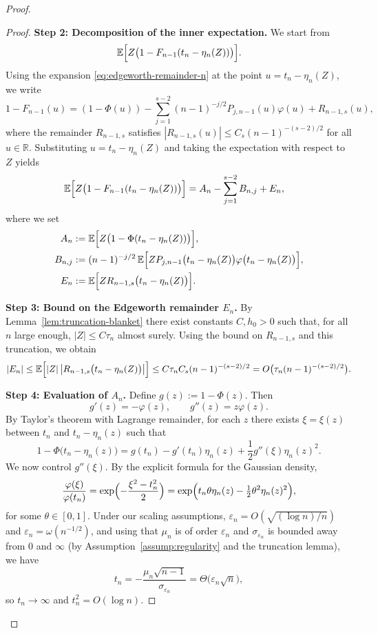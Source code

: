 \documentclass{article}
\theoremstyle{plain}
\theoremstyle{definition}
\begin{document}
\begin{proof}
\begin{proof}
\medskip\noindent\textbf{Step 2: Decomposition of the inner expectation.}
We start from
\[
  \mathbb E\Bigl[
    Z\bigl(1-F_{n-1}(t_n-\eta_n(Z))\bigr)
  \Bigr].
\]
Using the expansion \eqref{eq:edgeworth-remainder-n} at the point
$u=t_n-\eta_n(Z)$, we write
\[
  1-F_{n-1}(u)
  = (1-\Phi(u))
    - \sum_{j=1}^{s-2}(n-1)^{-j/2}P_{j,n-1}(u)\varphi(u)
    + R_{n-1,s}(u),
\]
where the remainder $R_{n-1,s}$ satisfies
\(
  |R_{n-1,s}(u)|
  \le C_s (n-1)^{-(s-2)/2}
\)
for all $u\in\mathbb R$. Substituting $u=t_n-\eta_n(Z)$ and taking the
expectation with respect to $Z$ yields
\begin{align*}
  \mathbb E\Bigl[
    Z\bigl(1-F_{n-1}(t_n-\eta_n(Z))\bigr)
  \Bigr]
  &= A_n - \sum_{j=1}^{s-2}B_{n,j} + E_n,
\end{align*}
where we set
\begin{align*}
  A_n
  &:= \mathbb E\Bigl[
        Z\bigl(1-\Phi(t_n-\eta_n(Z))\bigr)
      \Bigr],\\
  B_{n,j}
  &:= (n-1)^{-j/2}\,
      \mathbb E\Bigl[
        Z P_{j,n-1}\bigl(t_n-\eta_n(Z)\bigr)
          \varphi\bigl(t_n-\eta_n(Z)\bigr)
      \Bigr],\\
  E_n
  &:= \mathbb E\Bigl[
        Z R_{n-1,s}\bigl(t_n-\eta_n(Z)\bigr)
      \Bigr].
\end{align*}

\medskip\noindent\textbf{Step 3: Bound on the Edgeworth remainder $E_n$.}
By Lemma~\ref{lem:truncation-blanket} there exist constants
$C,h_0>0$ such that, for all $n$ large enough,
\(
  |Z|\le C \tau_n
\)
almost surely. Using the bound on $R_{n-1,s}$ and this truncation, we
obtain
\[
  |E_n|
  \le \mathbb E\Bigl[
    |Z|\,
    \bigl|R_{n-1,s}\bigl(t_n-\eta_n(Z)\bigr)\bigr|
  \Bigr]
  \le C \tau_n C_s (n-1)^{-(s-2)/2}
  = O\bigl(\tau_n (n-1)^{-(s-2)/2}\bigr).
\]

\medskip\noindent\textbf{Step 4: Evaluation of $A_n$.}
Define $g(z):=1-\Phi(z)$. Then
\[
  g'(z) = -\varphi(z),\qquad
  g''(z) = z\varphi(z).
\]
By Taylor's theorem with Lagrange remainder, for each $z$ there exists
$\xi=\xi(z)$ between $t_n$ and $t_n-\eta_n(z)$ such that
\begin{equation}
  \label{eq:taylor-g-n}
  1-\Phi\bigl(t_n-\eta_n(z)\bigr)
  = g(t_n) - g'(t_n)\eta_n(z)
    + \frac12 g''(\xi)\eta_n(z)^2.
\end{equation}
We now control $g''(\xi)$. By the explicit formula for the Gaussian
density,
\[
  \frac{\varphi(\xi)}{\varphi(t_n)}
  = \exp\Bigl(-\frac{\xi^2-t_n^2}{2}\Bigr)
  = \exp\Bigl(
      t_n\theta\eta_n(z)-\tfrac12\theta^2\eta_n(z)^2
    \Bigr),
\]
for some $\theta\in[0,1]$. Under our scaling assumptions,
$\varepsilon_n = O(\sqrt{(\log n)/n})$ and
$\varepsilon_n=\omega(n^{-1/2})$, and using that $\mu_n$ is of order
$\varepsilon_n$ and $\sigma_{\varepsilon_n}$ is bounded away from $0$
and $\infty$ (by Assumption~\ref{assump:regularity} and the truncation
lemma), we have
\[
  t_n
  = -\frac{\mu_n\sqrt{n-1}}{\sigma_{\varepsilon_n}}
  = \Theta\bigl(\varepsilon_n\sqrt{n}\bigr),
\]
so $t_n\to\infty$ and $t_n^2 = O(\log n)$.


\end{proof}
\end{proof}
\end{document}
